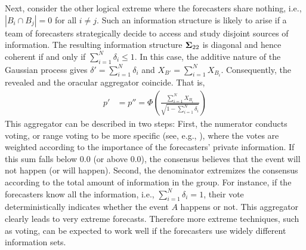 \documentclass[12pt]{article}
\theoremstyle{definition}
\theoremstyle{definition}
\begin{document}
Next, consider the other logical extreme where the forecasters share nothing, i.e.,  $|B_{i} \cap B_{j}| = 0$ for all $i \neq j$. Such
an information structure is likely to arise if a team of forecasters
strategically decide to access and study disjoint sources of
information. The resulting information structure ${\bf\Sigma}_{22}$ is
diagonal and hence coherent if and only if $\sum_{i=1}^N \delta_i
\leq 1$. In this case, the additive nature of the Gaussian process gives $\delta' = \sum_{i=1}^N \delta_i$ and $X_{B'} = \sum_{i=1}^N X_{B_i}$. Consequently, the revealed and  the oracular aggregator coincide. That is,
 \begin{align*}
p' &= p'' =  \Phi\left( \frac{\sum_{i=1}^N X_{B_i}}
  {\sqrt{1- \sum_{i=1}^N \delta_i}} \right) 
\end{align*}
This aggregator can be described in two steps: First, the numerator conducts voting, or range voting to be more specific (see, e.g.,
\citealt{fishkin1997voice}), where the votes are weighted according to
the importance of the forecasters' private information.  If this sum falls below
$0.0$ (or above $0.0$), the consensus believes that the event will not
happen (or will happen). Second, the
denominator extremizes the consensus according to the total
amount of information in the group. For instance, if the forecasters
know all the information, i.e., $\sum_{i=1}^N \delta_i = 1$, their vote
deterministically indicates whether the event $A$ happens or not. This
aggregator clearly leads to very extreme forecasts. Therefore
more extreme techniques, such as voting, can be expected to work well
if the forecasters use widely different information sets.
\end{document}

